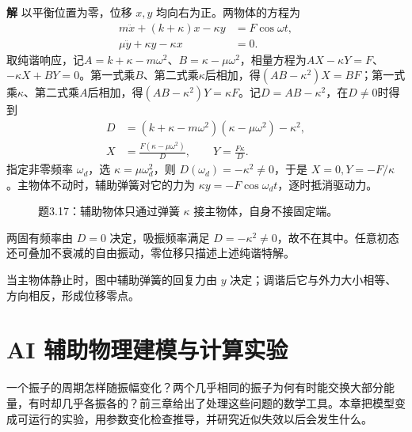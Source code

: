 \documentclass[11pt,openany,fontset=fandol]{ctexbook}
\theoremstyle{plain}\newtheorem{theorem}{定理}[chapter]\newtheorem{proposition}[theorem]{命题}
\theoremstyle{definition}\newtheorem{definition}{定义}[chapter]\newtheorem{example}{例}[chapter]
\theoremstyle{remark}\newtheorem*{remark}{说明}
\newcommand{\SolutionStart}{\par\nobreak\medskip\nobreak\noindent\textbf{解}\quad\ignorespaces}
\newenvironment{solution}{\SolutionStart}{\par\medskip}
\begin{document}
\begin{enumerate}[label=3.\arabic*]
\begin{solution}
以平衡位置为零，位移 $x,y$ 均向右为正。两物体的方程为
\begin{align*}
m\ddot x+(k+\kappa)x-\kappa y&=F\cos\omega t,\\
\mu\ddot y+\kappa y-\kappa x&=0.
\end{align*}
取纯谐响应，记$A=k+\kappa-m\omega^2$、$B=\kappa-\mu\omega^2$，相量方程为$AX-\kappa Y=F$、$-\kappa X+BY=0$。第一式乘$B$、第二式乘$\kappa$后相加，得$(AB-\kappa^2)X=BF$；第一式乘$\kappa$、第二式乘$A$后相加，得$(AB-\kappa^2)Y=\kappa F$。记$D=AB-\kappa^2$，在$D\ne0$时得到
\begin{align*}
D&=(k+\kappa-m\omega^2)(\kappa-\mu\omega^2)-\kappa^2,\\
X&=\frac{F(\kappa-\mu\omega^2)}D,\qquad Y=\frac{F\kappa}D.
\end{align*}
指定非零频率 $\omega_d$，选 $\kappa=\mu\omega_d^2$，则 $D(\omega_d)=-\kappa^2\ne0$，于是 $X=0,Y=-F/\kappa$。主物体不动时，辅助弹簧对它的力为 $\kappa y=-F\cos\omega_dt$，逐时抵消驱动力。

\begin{figure}[H]\centering
{}
\caption{题3.17：辅助物体只通过弹簧 $\kappa$ 接主物体，自身不接固定端。}\label{fig:ex-3-17}
\end{figure}

两固有频率由 $D=0$ 决定，吸振频率满足 $D=-\kappa^2\ne0$，故不在其中。任意初态还可叠加不衰减的自由振动，零位移只描述上述纯谐特解。

当主物体静止时，图中辅助弹簧的回复力由 $y$ 决定；调谐后它与外力大小相等、方向相反，形成位移零点。
\end{solution}

\end{enumerate}

\chapter{AI 辅助物理建模与计算实验}
一个振子的周期怎样随振幅变化？两个几乎相同的振子为何有时能交换大部分能量，有时却几乎各振各的？前三章给出了处理这些问题的数学工具。本章把模型变成可运行的实验，用参数变化检查推导，并研究近似失效以后会发生什么。
\end{document}
